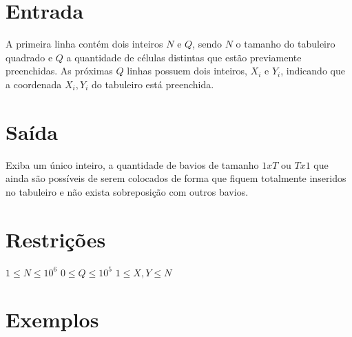 \section*{Entrada}

A primeira linha contém dois inteiros $N$ e $Q$, sendo $N$ o tamanho do tabuleiro quadrado e $Q$ a quantidade de células distintas que estão previamente preenchidas.
As próximas $Q$ linhas possuem dois inteiros, $X_i$ e $Y_i$, indicando que a coordenada $X_i, Y_i$ do tabuleiro está preenchida.

\section*{Saída}

Exiba um único inteiro, a quantidade de bavios de tamanho $1xT$ ou $Tx1$ que ainda são possíveis de serem colocados de forma que fiquem totalmente inseridos no tabuleiro e não exista sobreposição com outros bavios.

\section*{Restrições}

$1 \leq N \leq 10^6$
$0 \leq Q \leq 10^5$
$1 \leq X, Y \leq N$

\section*{Exemplos}
\exemplo
